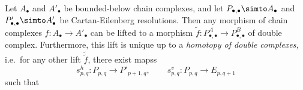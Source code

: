 \documentclass[main.tex]{subfiles}
\begin{document}
\begin{proposition}
  Let $A_{\bullet}$ and $A'_{\bullet}$ be bounded-below chain complexes, and let $P_{\bullet,\bullet} \simto A_{\bullet}$ and $P'_{\bullet,\bullet} \simto A'_{\bullet}$ be Cartan-Eilenberg resolutions. Then any morphism of chain complexes $f\colon A_{\bullet} \to A'_{\bullet}$ can be lifted to a morphism $\tilde{f}\colon P^{A}_{\bullet,\bullet} \to P^{B}_{\bullet,\bullet}$ of double complex. Furthermore, this lift is unique up to a \emph{homotopy of double complexes,} i.e.\ for any other lift $\tilde{\tilde{f}}$, there exist mapss
  \begin{equation*}
    s^{h}_{p,q}\colon P_{p,q} \to P'_{p+1,q},\qquad s^{v}_{p,q}\colon P_{p, q} \to E_{p, q+1}
  \end{equation*}
  such that
\end{proposition}
\end{document}
